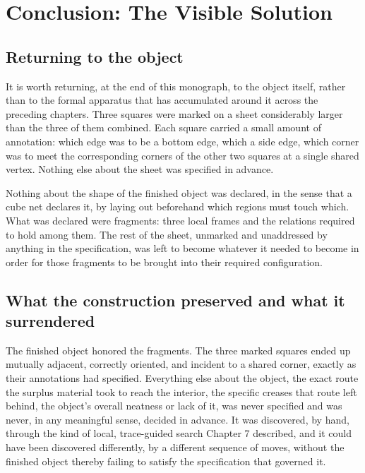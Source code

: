 \documentclass[11pt,oneside]{book}
\begin{document}
\hypertarget{conclusion.-the-visible-solution}{%
\chapter*{Conclusion: The Visible Solution}
\label{conclusion.-the-visible-solution}}

\hypertarget{returning-to-the-object}{%
\section{Returning to the object}\label{returning-to-the-object}}

It is worth returning, at the end of this monograph, to the object
itself, rather than to the formal apparatus that has accumulated around
it across the preceding chapters. Three squares were marked on a sheet
considerably larger than the three of them combined. Each square carried
a small amount of annotation: which edge was to be a bottom edge, which
a side edge, which corner was to meet the corresponding corners of the
other two squares at a single shared vertex. Nothing else about the
sheet was specified in advance.

Nothing about the shape of the finished object was declared, in the
sense that a cube net declares it, by laying out beforehand which
regions must touch which. What was declared were fragments: three local
frames and the relations required to hold among them. The rest of the
sheet, unmarked and unaddressed by anything in the specification, was
left to become whatever it needed to become in order for those fragments
to be brought into their required configuration.

\hypertarget{what-the-construction-preserved-and-what-it-surrendered}{%
\section{What the construction preserved and what it
surrendered}\label{what-the-construction-preserved-and-what-it-surrendered}}

The finished object honored the fragments. The three marked squares
ended up mutually adjacent, correctly oriented, and incident to a shared
corner, exactly as their annotations had specified. Everything else
about the object, the exact route the surplus material took to reach the
interior, the specific creases that route left behind, the object's
overall neatness or lack of it, was never specified and was never, in
any meaningful sense, decided in advance. It was discovered, by hand,
through the kind of local, trace-guided search Chapter 7 described, and
it could have been discovered differently, by a different sequence of
moves, without the finished object thereby failing to satisfy the
specification that governed it.
\end{document}
